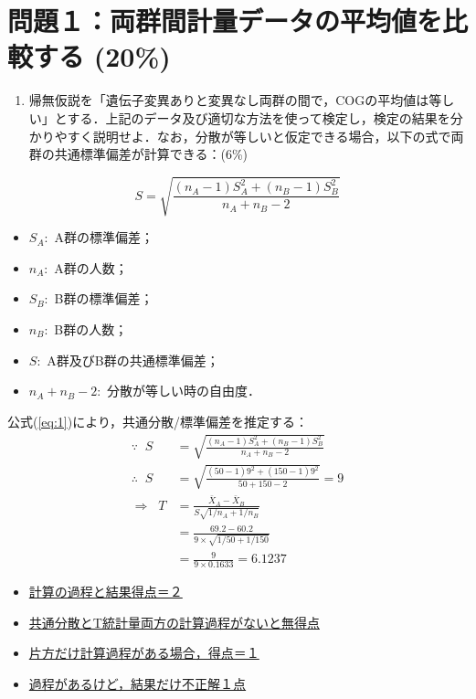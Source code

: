 \documentclass[11pt,]{problemset}
\title{}
\author{}
\date{}
\author{学籍番号:}
\providecommand{\tightlist}{%
  \setlength{\itemsep}{0pt}\setlength{\parskip}{0pt}}
\begin{document}
\hypertarget{-20}{%
\section{問題１：両群間計量データの平均値を比較する (20\%)}\label{-20}}

\begin{enumerate}
\def\labelenumi{\arabic{enumi}.}
\tightlist
\item
  帰無仮説を「遺伝子変異ありと変異なし両群の間で，COGの平均値は等しい」とする．上記のデータ及び適切な方法を使って検定し，検定の結果を分かりやすく説明せよ．なお，分散が等しいと仮定できる場合，以下の式で両群の共通標準偏差が計算できる：(6\%)
\end{enumerate}

\begin{equation}
  \label{eq:1}
S = \sqrt{\frac{(n_A - 1)S^2_A + (n_B - 1)S^2_B}{n_A + n_B -2}}
\end{equation}

\begin{itemize}
\tightlist
\item
  \(S_A:\) A群の標準偏差；
\item
  \(n_A:\) A群の人数；
\item
  \(S_B:\) B群の標準偏差；
\item
  \(n_B:\) B群の人数；
\item
  \(S:\) A群及びB群の共通標準偏差；
\item
  \(n_A + n_B -2:\) 分散が等しい時の自由度．
\end{itemize}

公式(\ref{eq:1})により，共通分散/標準偏差を推定する： \[
\begin{aligned}
\because\;\;  S & = \sqrt{\frac{(n_A - 1)S^2_A + (n_B - 1)S^2_B}{n_A + n_B -2}} \\
\therefore\;\; S & =  \sqrt{\frac{(50 - 1)9^2 + (150 - 1)9^2}{50 + 150 -2}} = 9 \\
\Rightarrow\;\; T & = \frac{\bar{X}_A - \bar{X}_B}{S\sqrt{1/n_A + 1/n_B}} \\ 
                  & = \frac{69.2 - 60.2}{9\times\sqrt{1/50 + 1/150}} \\ 
                  & = \frac{9}{9\times0.1633} = 6.1237
\end{aligned}
\]

\begin{itemize}
\item
  \underline{計算の過程と結果得点＝２}
\item
  \underline{共通分散とT統計量両方の計算過程がないと無得点}
\item
  \underline{片方だけ計算過程がある場合，得点＝１}
\item
  \underline{過程があるけど，結果だけ不正解１点}
\end{itemize}
\end{document}
